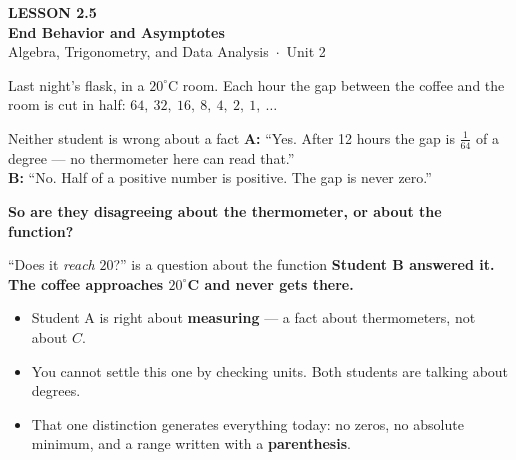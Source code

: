 \documentclass[aspectratio=169, 11pt]{beamer}
\begin{document}
{
\begin{frame}[plain]
  \vspace{2.8cm}\hspace{0.55cm}%
  \begin{minipage}{0.9\textwidth}
    {\color{goldacc}\bfseries\small LESSON 2.5}\\[0.5cm]
    {\color{white}\bfseries\LARGE End Behavior and Asymptotes}\\[1.2cm]
    {\color{mistmid}\small Algebra, Trigonometry, and Data Analysis~$\cdot$~Unit 2}
  \end{minipage}
\end{frame}
}

\begin{frame}[t, plain]
  Last night's flask, in a $20^\circ$C room. Each hour the gap between the coffee and the room is cut
  in half: \quad $64, \ 32, \ 16, \ 8, \ 4, \ 2, \ 1, \ \dots$
  \begin{block}{Neither student is wrong about a fact}
    \small
    \textbf{A:} ``Yes. After 12 hours the gap is $\tfrac{1}{64}$ of a degree --- no thermometer here
    can read that.''\\[0.15cm]
    \textbf{B:} ``No. Half of a positive number is positive. The gap is never zero.''
  \end{block}
  \vspace{0.1cm}
  \textbf{So are they disagreeing about the thermometer, or about the function?}
\end{frame}

\begin{frame}[t, plain]
  \begin{block}{``Does it \emph{reach} $20$?'' is a question about the function}
    \centering\large
    \textbf{Student B answered it. The coffee approaches $20^\circ$C and never gets there.}
  \end{block}
  \begin{itemize}
    \setlength{\itemsep}{0.3cm}
    \item Student A is right about \textbf{measuring} --- a fact about thermometers, not about $C$.
    \item You cannot settle this one by checking units. Both students are talking about degrees.
    \item That one distinction generates everything today: no zeros, no absolute minimum, and a range
          written with a \textbf{parenthesis}.
  \end{itemize}
\end{frame}
\end{document}
